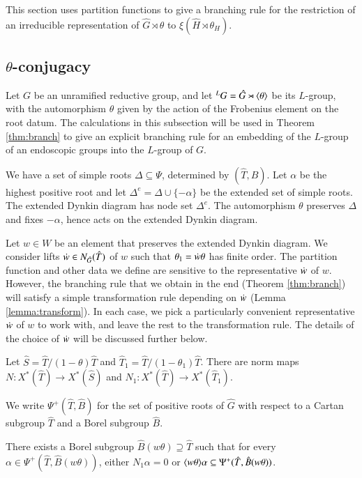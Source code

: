 This section uses partition functions to give a branching rule for
the restriction of an irreducible representation of $\hat G\rtimes\theta$
to $\xi(\hat H\rtimes \theta_H)$.

\subsection{$\theta$-conjugacy}\label{sec:theta-conj}

Let $G$ be an unramified reductive group, and let ${}^LG = \hat G
\rtimes \langle{\theta}\rangle$ be its $L$-group, with the automorphism $\theta$
given by the action of the Frobenius element on the root datum.  
The calculations in this subsection will be used in Theorem
\ref{thm:branch} to give an explicit branching rule for an embedding of
the $L$-group of an endoscopic groups into the $L$-group of $G$.

We have a set of simple roots $\Delta\subseteq \Psi$, determined by
$(\hat T,\hat B)$.  Let $\alpha$ be the highest positive root and let
$\Delta^e = \Delta \cup \{-\alpha\}$ be the extended set of simple
roots.  The extended Dynkin diagram has node set $\Delta^e$.  The
automorphism $\theta$ preserves $\Delta$ and fixes $-\alpha$, hence
acts on the extended Dynkin diagram.

Let $w\in W$ be an element that preserves the extended Dynkin diagram.
We consider lifts $\dot w\in N_{\hat G}(\hat T)$ of $w$ such that
$\theta_1 = \dot w \theta$ has finite order.  The partition function
and other data we define are sensitive to the
representative $\dot w$ of $w$.  However, the branching rule that we
obtain in the end (Theorem \ref{thm:branch}) will satisfy a simple
transformation rule depending on $\dot w$ (Lemma
\ref{lemma:transform}).  In each case, we pick a particularly
convenient representative $\dot w$ of $w$ to work with, and leave the
rest to the transformation rule.  The details of the choice of $\dot w$
will be discussed further below.

Let $\hat S = \hat T/(1-\theta)\hat T$ and $\hat T_1 = \hat
T/(1-\theta_1)\hat T$.  There are norm maps $N:X^*(\hat T)\to X^*(\hat
S)$ and $N_1:X^*(\hat T)\to X^*(\hat T_1)$.  

We write $\Psi^+(\hat T,\hat B)$ for the set of positive roots of
$\hat G$ with respect to a Cartan subgroup $\hat T$ and a Borel subgroup
$\hat B$.

\begin{lemma}\label{lemma:adapted}
  There exists a Borel subgroup $\hat
  B(w\theta)\supseteq \hat T$ such that for every
  $\alpha\in\Psi^+(\hat T,\hat B(w\theta))$, either $N_1\alpha = 0$
  or $\langle{w\theta}\rangle\alpha\subseteq \Psi^+(\hat T,\hat B(w\theta))$.
\end{lemma}

